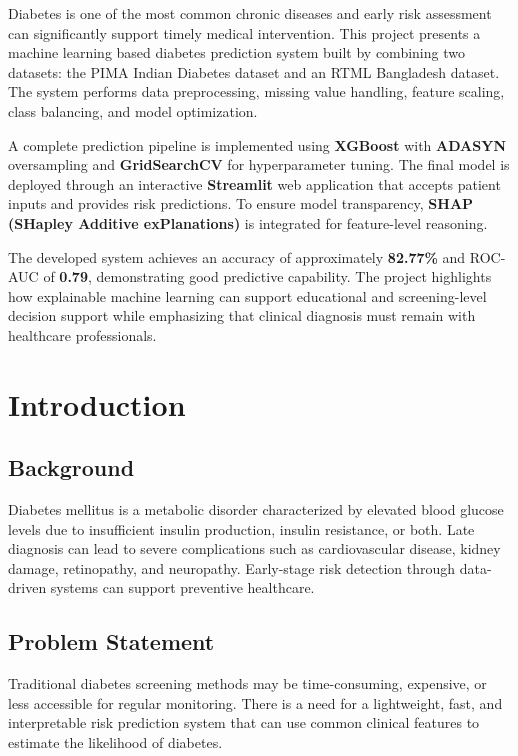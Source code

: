 \documentclass[12pt,a4paper]{report}
\begin{document}
Diabetes is one of the most common chronic diseases and early risk assessment can significantly support timely medical intervention. This project presents a machine learning based diabetes prediction system built by combining two datasets: the PIMA Indian Diabetes dataset and an RTML Bangladesh dataset. The system performs data preprocessing, missing value handling, feature scaling, class balancing, and model optimization.

A complete prediction pipeline is implemented using \textbf{XGBoost} with \textbf{ADASYN} oversampling and \textbf{GridSearchCV} for hyperparameter tuning. The final model is deployed through an interactive \textbf{Streamlit} web application that accepts patient inputs and provides risk predictions. To ensure model transparency, \textbf{SHAP (SHapley Additive exPlanations)} is integrated for feature-level reasoning.

The developed system achieves an accuracy of approximately \textbf{82.77\%} and ROC-AUC of \textbf{0.79}, demonstrating good predictive capability. The project highlights how explainable machine learning can support educational and screening-level decision support while emphasizing that clinical diagnosis must remain with healthcare professionals.

\newpage

\tableofcontents
\newpage
\listoftables
\newpage
\listoffigures
\newpage

\chapter{Introduction}

\section{Background}
Diabetes mellitus is a metabolic disorder characterized by elevated blood glucose levels due to insufficient insulin production, insulin resistance, or both. Late diagnosis can lead to severe complications such as cardiovascular disease, kidney damage, retinopathy, and neuropathy. Early-stage risk detection through data-driven systems can support preventive healthcare.

\section{Problem Statement}
Traditional diabetes screening methods may be time-consuming, expensive, or less accessible for regular monitoring. There is a need for a lightweight, fast, and interpretable risk prediction system that can use common clinical features to estimate the likelihood of diabetes.
\end{document}
